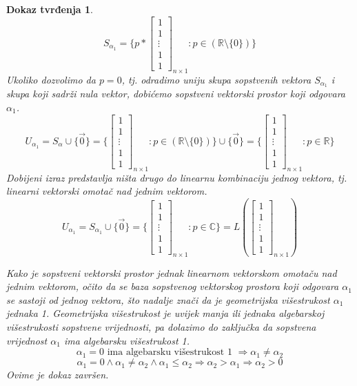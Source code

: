 \documentclass[11pt]{article}
\newtheorem*{custom_proof}{Dokaz tvrđenja}
\begin{document}
\begin{custom_proof}
	\[
	S_{\alpha_1} = \{p *
	\begin{bmatrix} 
	1 \\ 1 \\ \vdots \\ 1 \\ 1
	\end{bmatrix}_{n \times 1} : p \in (\mathbb{R} \setminus \{0\}) \} 
	\]
	Ukoliko dozvolimo da $p=0$, tj. odradimo uniju skupa sopstvenih vektora $S_{\alpha_1}$ i skupa koji sadrži nula vektor,
	dobićemo sopstveni vektorski prostor koji odgovara $\alpha_1$.
	\[
	U_{\alpha_1} = S_{\alpha} \cup \{\vec{0}\}= \{
	\begin{bmatrix} 
	1 \\ 1 \\ \vdots \\ 1 \\ 1
	\end{bmatrix}_{n \times 1}  : p \in (\mathbb{R} \setminus \{0\}) \} \cup \{\vec{0}\}= \{
	\begin{bmatrix} 
	1 \\ 1 \\ \vdots \\ 1 \\ 1
	\end{bmatrix}_{n \times 1} :  p \in \mathbb{R}\} 
	\]
	Dobijeni izraz predstavlja ništa drugo do linearnu kombinaciju jednog vektora, tj. linearni vektorski omotač nad jednim vektorom.
	\[
	U_{\alpha_1} = S_{\alpha_1} \cup \{\vec{0}\}= \{
	\begin{bmatrix} 
	1 \\ 1 \\ \vdots \\ 1 \\ 1
	\end{bmatrix}_{n \times 1} :  p \in \mathbb{C}\} = L (\begin{bmatrix} 
	1 \\ 1 \\ \vdots \\ 1 \\ 1
	\end{bmatrix}_{n \times 1})
	\]

	Kako je sopstveni vektorski prostor jednak linearnom vektorskom omotaču nad jednim vektorom, 
	očito da se baza sopstvenog vektorskog prostora koji odgovara $\alpha_1$ se sastoji od jednog vektora,
	što nadalje znači da je geometrijska višestrukost $\alpha_1$ jednaka 1.
	Geometrijska višestrukost je uvijek manja ili jednaka algebarskoj višestrukosti sopstvene vrijednosti,
	pa dolazimo do zaključka da sopstvena vrijednost $\alpha_1$ ima algebarsku višestrukost 1.
	\[
	\alpha_1 = 0 \text{ ima algebarsku višestrukost 1 } \Rightarrow \alpha_1 \neq \alpha_2
	\]
	\[
	\alpha_1 = 0  \land \alpha_1 \neq \alpha_2 \land \alpha_1 \leq \alpha_2 \Rightarrow \alpha_2 > \alpha_1 \Rightarrow \alpha_2 > 0
	\]
	Ovime je dokaz završen.
	\end{custom_proof}
	
\end{document}
